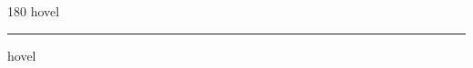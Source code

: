
\begin{frame}
\begin{center}
\begin{turn}{180}
{\fontsize{2.5cm}{1em}\selectfont hovel}
\end{turn}
\vspace{1em}\par  
\hrule
\vspace{1em}\par  
{\fontsize{2.5cm}{1em}\selectfont hovel}
\end{center}
\end{frame}
